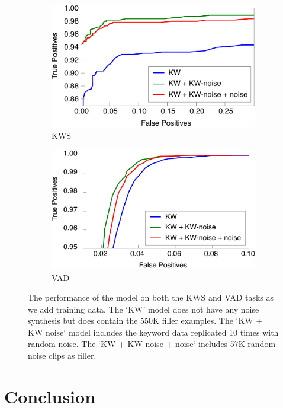 \begin{figure}
\centering
\begin{subfigure}{0.47\textwidth}
    \includegraphics[width=\textwidth]{kws/figures/data.pdf}
    \caption{KWS}
\end{subfigure}
\hfill
\begin{subfigure}{0.47\textwidth}
    \includegraphics[width=\textwidth]{kws/figures/data_vad.pdf}
    \caption{VAD}
\end{subfigure}
\caption{The performance of the model on both the KWS and VAD tasks as we add
         training data. The `KW' model does not have any noise synthesis but does
         contain the 550K filler examples. The `KW + KW noise` model includes
         the keyword data replicated 10 times with random noise. The `KW + KW noise
         + noise` includes 57K random noise clips as filler.}
\label{fig:kws:data} 
\end{figure}

\section{Conclusion}
\label{sec:kws:conclusion}

